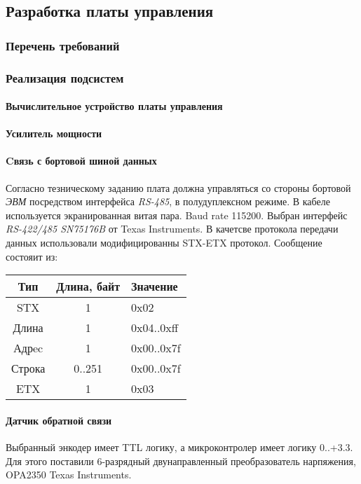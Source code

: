 \newpage
\subsection{Разработка платы управления}
\subsubsection{Перечень требований}
\subsubsection{Реализация подсистем}
\paragraph{Вычислительное устройство платы управления}
\paragraph{Усилитель мощности}

\paragraph{Cвязь с бортовой шиной данных}
Согласно тезническому заданию плата должна управляться со стороны бортовой
\textit{ЭВМ} посредством интерфейса \textit{RS-485}, в полудуплексном режиме.
В кабеле используется экранированная витая пара.
Baud rate 115200. Выбран интерфейс \textit{RS-422/485 SN75176B} от Texas Instruments.
В качетсве протокола передачи данных использовали модифицированны STX-ETX протокол.
Сообщение состояит из:

\begin{tabular}{|c|c|l|}
   \hline
   Тип & Длина, байт & Значение \\
   \hline
   STX    & 1      & 0x02 \\
   \hline
   Длина  & 1      & 0x04..0xff \\
   \hline
   Адрec  & 1      & 0x00..0x7f \\
   \hline
   Строка & 0..251 & 0x00..0x7f \\
   \hline
   ETX    & 1      & 0x03 \\
   \hline
\end{tabular}

\paragraph{Датчик обратной связи}
Выбранный энкодер имеет TTL логику, а микроконтролер имеет логику 0..+3.3.
Для этого поставили 6-разрядный двунаправленный преобразователь нарпяжения,
OPA2350 Texas Instruments.
